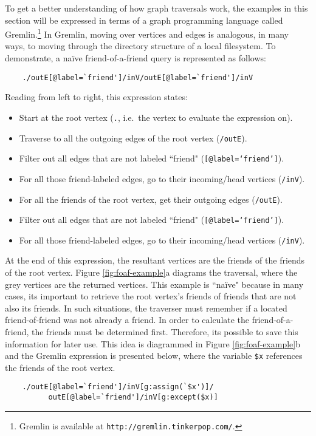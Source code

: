 \documentclass{svmult}
\newcommand{\ttt}{\texttt}
\begin{document}
To get a better understanding of how graph traversals work, the examples in this section will be expressed in terms of a graph programming language called Gremlin.\footnote{Gremlin is available at \ttt{http://gremlin.tinkerpop.com/}.} In Gremlin, moving over vertices and edges is analogous, in many ways, to moving through the directory structure of a local filesystem. To demonstrate, a na\"ive friend-of-a-friend query is represented as follows:
\begin{verbatim}
	./outE[@label=`friend']/inV/outE[@label=`friend']/inV
\end{verbatim}
Reading from left to right, this expression states:
\begin{itemize}
	\item Start at the root vertex (\ttt{.}, i.e.~the vertex to evaluate the expression on).
	\item Traverse to all the outgoing edges of the root vertex (\ttt{/outE}).
	\item Filter out all edges that are not labeled ``friend" (\ttt{[@label=`friend']}).
	\item For all those friend-labeled edges, go to their incoming/head vertices (\ttt{/inV}).
	\item For all the friends of the root vertex, get their outgoing edges (\ttt{/outE}).
	\item Filter out all edges that are not labeled ``friend" (\ttt{[@label=`friend']}).
	\item For all those friend-labeled edges, go to their incoming/head vertices (\ttt{/inV}).
\end{itemize}
At the end of this expression, the resultant vertices are the friends of the friends of the root vertex. Figure \ref{fig:foaf-example}a diagrams the traversal, where the grey vertices are the returned vertices. This example is ``na\"ive" because in many cases, its important to retrieve the root vertex's friends of friends that are not also its friends. In such situations, the traverser must remember if a located friend-of-friend was not already a friend. In order to calculate the friend-of-a-friend, the friends must be determined first. Therefore, its possible to save this information for later use. This idea is diagrammed in Figure \ref{fig:foaf-example}b and the Gremlin expression is presented below, where the variable \ttt{\$x} references the friends of the root vertex.
\begin{verbatim}
	./outE[@label=`friend']/inV[g:assign(`$x')]/
	      outE[@label=`friend']/inV[g:except($x)]
\end{verbatim}
\end{document}
